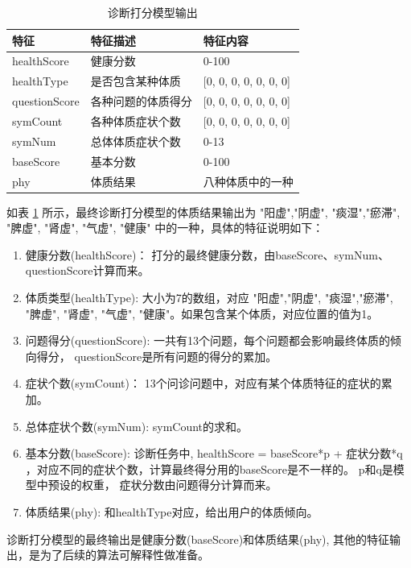 \begin{table}[h]
    \begin{center}
        \begin{tabular}{lll}
            \toprule
            特征 & 特征描述 & 特征内容 \\ 
            \midrule
            healthScore & 健康分数 & 0-100 \\
            healthType & 是否包含某种体质 & {[}0, 0, 0, 0, 0, 0, 0{]} \\ 
            questionScore & 各种问题的体质得分 & {[}0, 0, 0, 0, 0, 0, 0{]} \\
            symCount & 各种体质症状个数 & {[}0, 0, 0, 0, 0, 0, 0{]} \\
            symNum & 总体体质症状个数 & 0-13 \\
            baseScore & 基本分数 & 0-100 \\
            phy & 体质结果 & 八种体质中的一种\\
            \bottomrule
        \end{tabular}
    \end{center}
    \caption{诊断打分模型输出}
    \label{tab:diag-feature}
\end{table}


如表 \ref{tab:diag-feature} 所示，最终诊断打分模型的体质结果输出为 "阳虚","阴虚", "痰湿","瘀滞", "脾虚", "肾虚", "气虚", "健康" 中的一种，具体的特征说明如下：
\begin{enumerate}
    \item 健康分数(healthScore)： 打分的最终健康分数，由baseScore、symNum、questionScore计算而来。

    \item 体质类型(healthType): 大小为7的数组，对应 "阳虚","阴虚", "痰湿","瘀滞", "脾虚", "肾虚", "气虚", "健康"。如果包含某个体质，对应位置的值为1。

    \item 问题得分(questionScore): 一共有13个问题，每个问题都会影响最终体质的倾向得分， questionScore是所有问题的得分的累加。

    \item 症状个数(symCount)： 13个问诊问题中，对应有某个体质特征的症状的累加。

    \item 总体症状个数(symNum): symCount的求和。

    \item 基本分数(baseScore): 诊断任务中, healthScore = baseScore*p + 症状分数*q ，对应不同的症状个数，计算最终得分用的baseScore是不一样的。 
p和q是模型中预设的权重， 症状分数由问题得分计算而来。

    \item 体质结果(phy): 和healthType对应，给出用户的体质倾向。
\end{enumerate}
诊断打分模型的最终输出是健康分数(baseScore)和体质结果(phy), 其他的特征输出，是为了后续的算法可解释性做准备。


